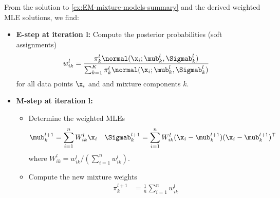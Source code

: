\begin{exenumerate}
    \begin{solution}
      From the solution to \ref{ex:EM-mixture-models-summary} and the derived
      weighted MLE solutions, we find:
      \begin{itemize}
      \item \textbf{E-step at iteration l:} Compute the posterior probabilities (soft assignments)
        \begin{align}
          w_{ik}^l & =  \frac{ \pi^l_k \normal(\x_i; \mub^l_k, \Sigmab_k^l)}{ \sum_{k=1}^K\pi^l_k \normal(\x_i; \mub^l_k, \Sigmab_k^l) } 
      \end{align}
      for all data points $\x_i$ and and mixture components $k$.
    \item  \textbf{M-step at iteration l:}
      \begin{itemize}
      \item Determine the weighted MLEs
        \begin{align}
          \mub_k^{l+1} & =   \sum_{i=1}^n W^l_{ik}\x_i&  \Sigmab_k^{l+1} &=    \sum_{i=1}^n W^l_{ik} (\x_i- \mub_k^{l+1})(\x_i- \mub_k^{l+1})^\top
        \end{align}
        where $W^l_{ik} = w_{ik}^l/(\sum_{i=1}^n w_{ik}^l)$.
      \item Compute the new mixture weights
      \begin{align}
        \pi_k^{l+1} &=  \frac{1}{n}\sum_{i=1}^n w_{ik}^l
      \end{align}
    \end{itemize}
  \end{itemize}
  
      
    \end{solution}
      
\end{exenumerate}
 
